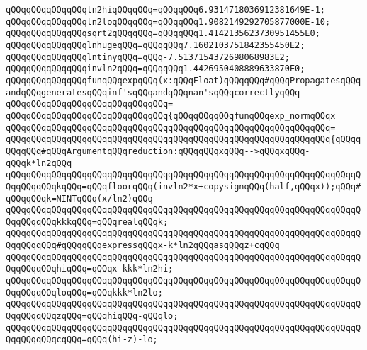 \verb|qQQqqQQqqQQqqQQqln2hiqQQqqQQq=qQQqqQQq6.9314718036912381649E-1;|\newline
\verb|qQQqqQQqqQQqqQQqln2loqQQqqQQq=qQQqqQQq1.9082149292705877000E-10;|\newline
\verb|qQQqqQQqqQQqqQQqsqrt2qQQqqQQq=qQQqqQQq1.4142135623730951455E0;|\newline
\verb|qQQqqQQqqQQqqQQqlnhugeqQQq=qQQqqQQq7.1602103751842355450E2;|\newline
\verb|qQQqqQQqqQQqqQQqlntinyqQQq=qQQq-7.5137154372698068983E2;|\newline
\verb|qQQqqQQqqQQqqQQqinvln2qQQq=qQQqqQQq1.4426950408889633870E0;|\newline
\newline
\verb|qQQqqQQqqQQqqQQqfunqQQqexpqQQq(x:qQQqFloat)qQQqqQQq#qQQqPropagatesqQQqandqQQqgeneratesqQQqinf'sqQQqandqQQqnan'sqQQqcorrectlyqQQq|\newline
\verb|qQQqqQQqqQQqqQQqqQQqqQQqqQQqqQQq=|\newline
\verb|qQQqqQQqqQQqqQQqqQQqqQQqqQQqqQQq{qQQqqQQqqQQqfunqQQqexp_normqQQqx|\newline
\verb|qQQqqQQqqQQqqQQqqQQqqQQqqQQqqQQqqQQqqQQqqQQqqQQqqQQqqQQqqQQqqQQq=|\newline
\verb|qQQqqQQqqQQqqQQqqQQqqQQqqQQqqQQqqQQqqQQqqQQqqQQqqQQqqQQqqQQqqQQq{qQQqqQQqqQQq#qQQqArgumentqQQqreduction:qQQqqQQqxqQQq-->qQQqxqQQq-qQQqk*ln2qQQq|\newline
\verb|qQQqqQQqqQQqqQQqqQQqqQQqqQQqqQQqqQQqqQQqqQQqqQQqqQQqqQQqqQQqqQQqqQQqqQQqqQQqqQQqkqQQq=qQQqfloorqQQq(invln2*x+copysignqQQq(half,qQQqx));qQQq#qQQqqQQqk=NINTqQQq(x/ln2)qQQq|\newline
\verb|qQQqqQQqqQQqqQQqqQQqqQQqqQQqqQQqqQQqqQQqqQQqqQQqqQQqqQQqqQQqqQQqqQQqqQQqqQQqqQQqkkkqQQq=qQQqrealqQQqk;|\newline
\verb|qQQqqQQqqQQqqQQqqQQqqQQqqQQqqQQqqQQqqQQqqQQqqQQqqQQqqQQqqQQqqQQqqQQqqQQqqQQqqQQq#qQQqqQQqexpressqQQqx-k*ln2qQQqasqQQqz+cqQQq|\newline
\verb|qQQqqQQqqQQqqQQqqQQqqQQqqQQqqQQqqQQqqQQqqQQqqQQqqQQqqQQqqQQqqQQqqQQqqQQqqQQqqQQqhiqQQq=qQQqx-kkk*ln2hi;|\newline
\verb|qQQqqQQqqQQqqQQqqQQqqQQqqQQqqQQqqQQqqQQqqQQqqQQqqQQqqQQqqQQqqQQqqQQqqQQqqQQqqQQqloqQQq=qQQqkkk*ln2lo;|\newline
\verb|qQQqqQQqqQQqqQQqqQQqqQQqqQQqqQQqqQQqqQQqqQQqqQQqqQQqqQQqqQQqqQQqqQQqqQQqqQQqqQQqzqQQq=qQQqhiqQQq-qQQqlo;|\newline
\verb|qQQqqQQqqQQqqQQqqQQqqQQqqQQqqQQqqQQqqQQqqQQqqQQqqQQqqQQqqQQqqQQqqQQqqQQqqQQqqQQqcqQQq=qQQq(hi-z)-lo;|\newline
